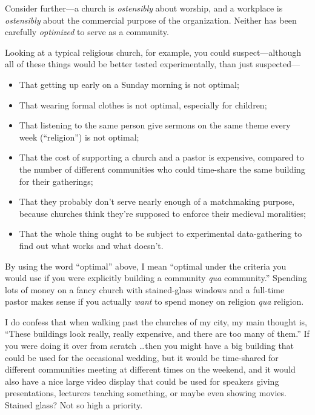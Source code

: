 {
 Consider further---a church is \textit{ostensibly} about worship,
and a workplace is \textit{ostensibly} about the commercial purpose of
the organization. Neither has been carefully \textit{optimized} to
serve as a community.}

{
 Looking at a typical religious church, for example, you could
suspect---although all of these things would be better tested
experimentally, than just suspected---}

\begin{itemize}
\item {
 That getting up early on a Sunday morning is not optimal;}

\item {
 That wearing formal clothes is not optimal, especially for
children;}

\item {
 That listening to the same person give sermons on the same theme
every week (``religion'') is not
optimal;}

\item {
 That the cost of supporting a church and a pastor is expensive,
compared to the number of different communities who could time-share
the same building for their gatherings;}

\item {
 That they probably don't serve nearly enough of a
matchmaking purpose, because churches think they're
supposed to enforce their medieval moralities;}

\item {
 That the whole thing ought to be subject to experimental
data-gathering to find out what works and what
doesn't.}
\end{itemize}

{
 By using the word ``optimal''
above, I mean ``optimal under the criteria you would
use if you were explicitly building a community \textit{qua}
community.'' Spending lots of money on a fancy church
with stained-glass windows and a full-time pastor makes sense if you
actually \textit{want} to spend money on religion \textit{qua}
religion.}

{
 I do confess that when walking past the churches of my city, my
main thought is, ``These buildings look really, really
expensive, and there are too many of them.'' If you
were doing it over from scratch \ldots then you might have a big
building that could be used for the occasional wedding, but it would be
time-shared for different communities meeting at different times on the
weekend, and it would also have a nice large video display that could
be used for speakers giving presentations, lecturers teaching
something, or maybe even showing movies. Stained glass? Not so high a
priority.}

